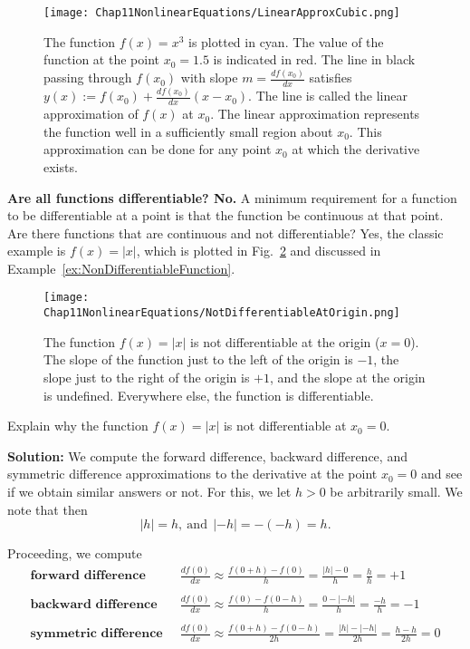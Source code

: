 \vspace*{.2cm} 

\begin{figure}[hbt!]
    \centering
    \texttt{[image: Chap11NonlinearEquations/LinearApproxCubic.png]}
    \caption[]{The function $f(x)=x^3$ is plotted in cyan. The value of the function at the point $x_0=1.5$ is indicated in red. The line in black passing through $f(x_0)$ with slope $m=\frac{df(x_0)}{dx}$ satisfies $y(x):=f(x_0) + \frac{df(x_0)}{dx} \left( x - x_0 \right)$. The line is called the linear approximation of $f(x)$ at $x_0$. The linear approximation represents the function well in a sufficiently small region about $x_0$. This approximation can be done for any point $x_0$ at which the derivative exists. 
    }
    \label{fig:LinearApproximationCubic}
    \end{figure}

\textbf{Are all functions differentiable? No.} A minimum requirement for a function to be differentiable at a point is that the function be continuous at that point. Are there functions that are continuous and not differentiable? Yes, the classic example is $f(x) = |x|$, which is plotted in Fig.~\ref{fig:NotDifferentiable} and discussed in Example~\ref{ex:NonDifferentiableFunction}. 

\begin{figure}[hbt!]
    \centering
    \texttt{[image: Chap11NonlinearEquations/NotDifferentiableAtOrigin.png]}
    \caption[]{The function $f(x)=|x|$ is not differentiable at the origin ($x=0$). The slope of the function just to the left of the origin is $-1$, the slope just to the right of the origin is $+1$, and the slope at the origin is undefined. Everywhere else, the function is differentiable.
    }
    \label{fig:NotDifferentiable}
    \end{figure}


\begin{example}
\label{ex:NonDifferentiableFunction}
Explain why the function $f(x)=|x|$ is not differentiable at $x_0=0$. 
\end{example}

\textbf{Solution:} We compute the forward difference, backward difference, and symmetric difference approximations to the derivative at the point $x_0=0$ and see if we obtain similar answers or not. For this, we let $h>0$ be arbitrarily small. We note that then 
$$|h|=h, ~\text{and}~~ |-h| = - (-h) = h. $$


Proceeding, we compute 
\begin{align*}
    \textbf{forward difference  } ~& \frac{df(0)}{dx} \approx \frac{f(0+h) -f(0)}{h} = \frac{|h| - 0}{h} = \frac{h}{h} = \boxed{+1}\\
    \\
    \textbf{backward difference  }~ & \frac{df(0)}{dx} \approx \frac{f(0) -f(0-h)}{h} = \frac{0 - |-h|}{h} = \frac{-h}{h} = \boxed{-1}\\
    \\
    \textbf{symmetric difference  }~  &\frac{df(0)}{dx}   \approx \frac{f(0+h) -f(0-h)}{2h} = \frac{|h| - |-h|}{2h} = \frac{h-h}{2h} = \boxed{0}
\end{align*}

